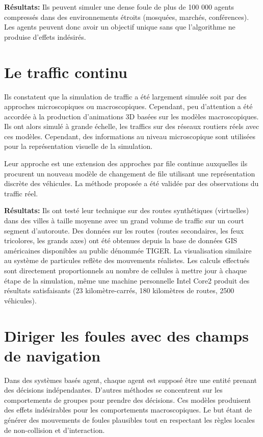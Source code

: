 \documentclass[11pt]{article}
\begin{document}
\textbf{Résultats:} Ils peuvent simuler une dense foule de plus de 100 000 agents compressés dans des environnements étroits (mosquées, marchés, conférences). Les agents peuvent donc avoir un objectif unique sans que l'algorithme ne produise d'effets indésirés.

\section{Le traffic continu}

Ils constatent que la simulation de traffic a été largement simulée soit par des approches microscopiques ou macroscopiques. Cependant, peu d'attention a été accordée à la production d'animations 3D basées sur les modèles macroscopiques. Ils ont alors simulé à grande échelle, les traffics sur des réseaux routiers réels avec ces modèles. Cependant, des informations au niveau microscopique sont utilisées pour la représentation visuelle de la simulation.

Leur approche est une extension des approches par file continue auxquelles ils procurent un nouveau modèle de changement de file utilisant une représentation discrète des véhicules. La méthode proposée a été validée par des observations du traffic réel.

\textbf{Résultats:} Ils ont testé leur technique sur des routes synthétiques (virtuelles) dans des villes à taille moyenne avec un grand volume de traffic sur un court segment d'autoroute. Des données sur les routes (routes secondaires, les feux tricolores, les grands axes) ont été obtenues depuis la base de données GIS américaines disponibles au public dénommée TIGER. La visualisation similaire au système de particules reflète des mouvements réalistes. Les calculs effectués sont directement proportionnels au nombre de cellules à mettre jour à chaque étape de la simulation, même une machine personnelle Intel Core2 produit des résultats satisfaisants (23 kilomètre-carrés, 180 kilomètres de routes, 2500 véhicules).

\section{Diriger les foules avec des champs de navigation}

Dans des systèmes basés agent, chaque agent est supposé être une entité prenant des décisions indépendantes. D'autres méthodes se concentrent sur les comportements de groupes pour prendre des décisions. Ces modèles produisent des effets indésirables pour les comportements macroscopiques. Le but étant de générer des mouvements de foules plausibles tout en respectant les règles locales de non-collision et d'interaction.
\end{document}
